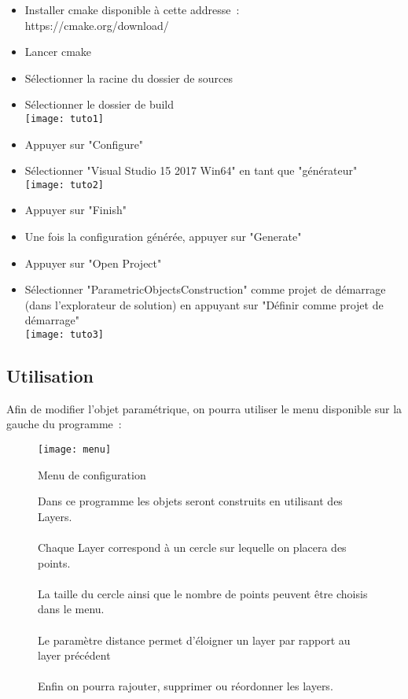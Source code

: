 \documentclass[article, backcover, french, nodocumentinfo]{upmethodology-document}
\begin{document}
		\begin{itemize}
			\item Installer cmake disponible à cette addresse~: \\
				https://cmake.org/download/
			\item Lancer cmake
			\item Sélectionner la racine du dossier de sources
			\item Sélectionner le dossier de build \\
				\texttt{[image: tuto1]}
			\item Appuyer sur "Configure"
			\item Sélectionner "Visual Studio 15 2017 Win64" en tant que "générateur" \\
				\texttt{[image: tuto2]}
			\item Appuyer sur "Finish"
			\item Une fois la configuration générée, appuyer sur "Generate"
			\item Appuyer sur "Open Project"
			\item Sélectionner "ParametricObjectsConstruction" comme projet de démarrage (dans l'explorateur de solution) en appuyant sur "Définir comme projet de démarrage" \\
				\texttt{[image: tuto3]}
		\end{itemize}

		\subsection{Utilisation}
			Afin de modifier l'objet paramétrique, on pourra utiliser le menu disponible sur la gauche du programme~: \\
			\begin{minipage}[t]{0.4\textwidth}
				\begin{figure}[H]
					\centering%
					\texttt{[image: menu]}%
					\caption{Menu de configuration}%
					\label{fig:menu}%
				\end{figure}
			\end{minipage}
			\begin{minipage}[t]{0.59\textwidth}
				\begin{figure}[H]
					Dans ce programme les objets seront construits en utilisant des Layers. \\
					\hfill \\
					Chaque Layer correspond à un cercle sur lequelle on placera des points. \\
					\hfill \\
					La taille du cercle ainsi que le nombre de points peuvent être choisis dans le menu. \\
					\hfill \\
					Le paramètre distance permet d'éloigner un layer par rapport au layer précédent \\
					\hfill \\
					Enfin on pourra rajouter, supprimer ou réordonner les layers.
				\end{figure}
			\end{minipage}
\end{document}
